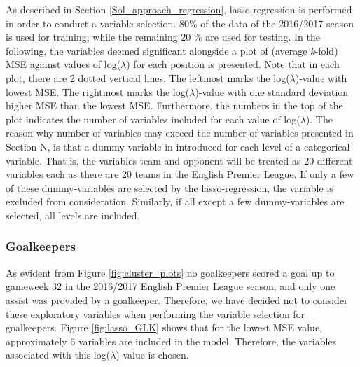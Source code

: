 As described in Section \ref{Sol_approach_regression}, lasso regression is performed in order to conduct a variable selection. 80\% of the data of the 2016/2017 season is used for training, while the remaining 20 \% are used for testing. In the following, the variables deemed significant alongside a plot of (average \textit{k}-fold) MSE against values of log($\lambda$) for each position is presented. Note that in each plot, there are 2 dotted vertical lines. The leftmost marks the log($\lambda$)-value with lowest MSE. The rightmost marks the log($\lambda$)-value with one standard deviation higher MSE than the lowest MSE. Furthermore, the numbers in the top of the plot indicates the number of variables included for each value of log($\lambda$). The reason why number of variables may exceed the number of variables presented in Section N, is that a dummy-variable in introduced for each level of a categorical variable. That is, the variables team and opponent will be treated as 20 different variables each as there are 20 teams in the English Premier League. If only a few of these dummy-variables are selected by the lasso-regression, the variable is excluded from consideration. Similarly, if all except a few dummy-variables are selected, all levels are included.

\newpar

\subsubsection{Goalkeepers}
As evident from Figure \ref{fig:cluster_plots} no goalkeepers scored a goal up to gameweek 32 in the 2016/2017 English Premier League season, and only one assist was provided by a goalkeeper. Therefore, we have decided not to consider these exploratory variables when performing the variable selection for goalkeepers. Figure \ref{fig:lasso_GLK} shows that for the lowest MSE value, approximately 6 variables are included in the model. Therefore, the variables associated with this log($\lambda$)-value is chosen.

